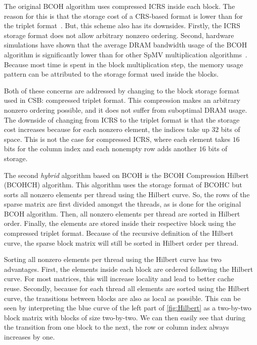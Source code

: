 \documentclass{siamart220329}
\begin{document}
The original BCOH algorithm uses compressed ICRS inside each block. The reason for this is that the storage cost of a CRS-based format is lower than for the triplet format~\cite{sparse-matrix-chapter}. But, this scheme also has its downsides. Firstly, the ICRS storage format does not allow arbitrary nonzero ordering. Second, hardware simulations have shown that the average DRAM bandwidth usage of the BCOH algorithm is significantly lower than for other SpMV multiplication algorithms~\cite{Kobe-Thesis}. Because most time is spent in the block multiplication step, the memory usage pattern can be attributed to the storage format used inside the blocks.

Both of these concerns are addressed by changing to the block storage format used in CSB: compressed triplet format. This compression makes an arbitrary nonzero ordering possible, and it does not suffer from suboptimal DRAM usage. The downside of changing from ICRS to the triplet format is that the storage cost increases because for each nonzero element, the indices take up $32$ bits of space. This is not the case for compressed ICRS, where each element takes $16$ bits for the column index and each nonempty row adds another $16$ bits of storage.

The second \textit{hybrid} algorithm based on BCOH is the BCOH Compression Hilbert (BCOHCH) algorithm. This algorithm uses the storage format of BCOHC but sorts all nonzero elements per thread using the Hilbert curve. So, the rows of the sparse matrix are first divided amongst the threads, as is done for the original BCOH algorithm. Then, all nonzero elements per thread are sorted in Hilbert order. Finally, the elements are stored inside their respective block using the compressed triplet format. Because of the recursive definition of the Hilbert curve, the sparse block matrix will still be sorted in Hilbert order per thread.

Sorting all nonzero elements per thread using the Hilbert curve has two advantages. First, the elements inside each block are ordered following the Hilbert curve. For most matrices, this will increase locality and lead to better cache reuse. Secondly, because for each thread all elements are sorted using the Hilbert curve, the transitions between blocks are also as local as possible. This can be seen by interpreting the blue curve of the left part of \cref{fig:Hilbert} as a two-by-two block matrix with blocks of size two-by-two. We can then easily see that during the transition from one block to the next, the row or column index always increases by one.
\end{document}
